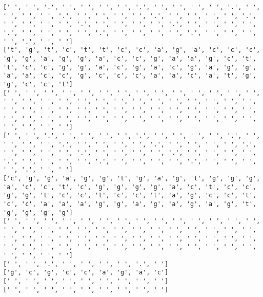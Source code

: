 \documentclass{article}
\begin{document}
\begin{Verbatim}
[' ', ' ', '.', ' ', ' ', ' ', ' ', '.', ' ', ' ', ' ', ' ', '.', ' ', ' ', ' ', ' ', '.', ' ', ' ', ' ', ' ', '.', ' ', ' ', ' ', ' ', '.', ' ', ' ', ' ', ' ', '.', ' ', ' ', ' ', ' ', '.', ' ', ' ', ' ', ' ', '.', ' ', ' ', ' ', ' ', '.', ' ', ' ', ' ', ' ', '.', ' ', ' ', ' ', ' ', '.', ' ', ' ']
['t', 'g', 't', 'c', 't', 't', 'c', 'c', 'a', 'g', 'a', 'c', 'c', 'c', 'g', 'g', 'a', 'g', 'g', 'a', 'c', 'c', 'g', 'a', 'a', 'g', 'c', 't', 't', 'c', 'c', 'g', 'g', 'a', 'c', 'g', 'a', 'c', 'g', 'a', 'g', 'g', 'a', 'a', 'c', 'c', 'g', 'c', 'c', 'c', 'a', 'a', 'c', 'a', 't', 'g', 'g', 'c', 'c', 't']
[' ', ' ', ' ', ' ', ' ', ' ', ' ', ' ', ' ', ' ', ' ', ' ', ' ', ' ', ' ', ' ', ' ', ' ', ' ', ' ', ' ', ' ', ' ', ' ', ' ', ' ', ' ', ' ', ' ', ' ', ' ', ' ', ' ', ' ', ' ', ' ', ' ', ' ', ' ', ' ', ' ', ' ', ' ', ' ', ' ', ' ', ' ', ' ', ' ', ' ', ' ', ' ', ' ', ' ', ' ', ' ', ' ', ' ', ' ', ' ']
[' ', ' ', '.', ' ', ' ', ' ', ' ', '.', ' ', ' ', ' ', ' ', '.', ' ', ' ', ' ', ' ', '.', ' ', ' ', ' ', ' ', '.', ' ', ' ', ' ', ' ', '.', ' ', ' ', ' ', ' ', '.', ' ', ' ', ' ', ' ', '.', ' ', ' ', ' ', ' ', '.', ' ', ' ', ' ', ' ', '.', ' ', ' ', ' ', ' ', '.', ' ', ' ', ' ', ' ', '.', ' ', ' ']
['c', 'g', 'g', 'a', 'g', 'g', 't', 'g', 'a', 'g', 't', 'g', 'g', 'g', 'a', 'c', 'c', 't', 'c', 'g', 'g', 'g', 'g', 'a', 'c', 't', 'c', 'c', 'g', 'g', 't', 'c', 'c', 't', 'c', 'c', 't', 'a', 'g', 'c', 'c', 't', 'c', 'c', 'a', 'a', 'a', 'g', 'g', 'a', 'g', 'a', 'g', 'a', 'g', 't', 'g', 'g', 'g', 'g']
[' ', ' ', ' ', ' ', ' ', ' ', ' ', ' ', ' ', ' ', ' ', ' ', ' ', ' ', ' ', ' ', ' ', ' ', ' ', ' ', ' ', ' ', ' ', ' ', ' ', ' ', ' ', ' ', ' ', ' ', ' ', ' ', ' ', ' ', ' ', ' ', ' ', ' ', ' ', ' ', ' ', ' ', ' ', ' ', ' ', ' ', ' ', ' ', ' ', ' ', ' ', ' ', ' ', ' ', ' ', ' ', ' ', ' ', ' ', ' ']
[' ', ' ', '.', ' ', ' ', ' ', ' ', '.', ' ']
['g', 'c', 'g', 'c', 'c', 'a', 'g', 'a', 'c']
[' ', ' ', ' ', ' ', ' ', ' ', ' ', ' ', ' ']
[' ', ' ', ' ', ' ', ' ', ' ', ' ', ' ', ' ']
 

\end{Verbatim}
\end{document}
